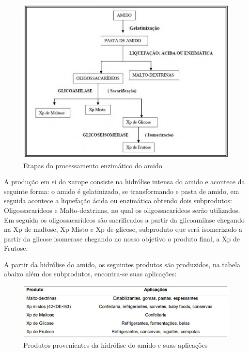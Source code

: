 \documentclass[
	12pt,				%
	openright,			%
	oneside,			%
	a4paper,			%
	english,			%
	french,				%
	spanish,			%
	brazil				%
	]{abntex2}
\begin{document}
\begin{figure}[H]
\begin{center}
\caption{Etapas do processamento enzimático do amido}
\includegraphics[scale=0.5]{Imagens/WhatsApp Image 2022-10-09 at 18.37.06.jpeg} 
\end{center}
\end{figure}

A produção em si do xarope consiste na hidrólise intensa do amido e acontece da seguinte forma: o amido é gelatinizado, se transformando e pasta de amido, em seguida acontece a liquefação ácida ou enzimática obtendo dois subprodutos: Oligossacarídeos e Malto-dextrinas, no qual os oligossacarídeos serão utilizados. Em seguida os oligossacarídeos são sacrificados a partir da glicoamilase chegando na Xp de maltose, Xp Misto e Xp de glicose, subproduto que será isomerizado a partir da glicose isomerase chegando no nosso objetivo o produto final, a Xp de Frutose.\cite{freitas2012desenvolvimento}


A partir da hidrólise do amido, os seguintes produtos são produzidos, na tabela abaixo além dos subprodutos, encontra-se suas aplicações:

\begin{figure}[H]
\begin{center}
\caption{Produtos provenientes da hidrólise do amido e suas aplicações}
\includegraphics[scale=0.5]{Imagens/WhatsApp Image 2022-10-09 at 18.37.25.jpeg} 
\end{center}
\end{figure}
\end{document}
